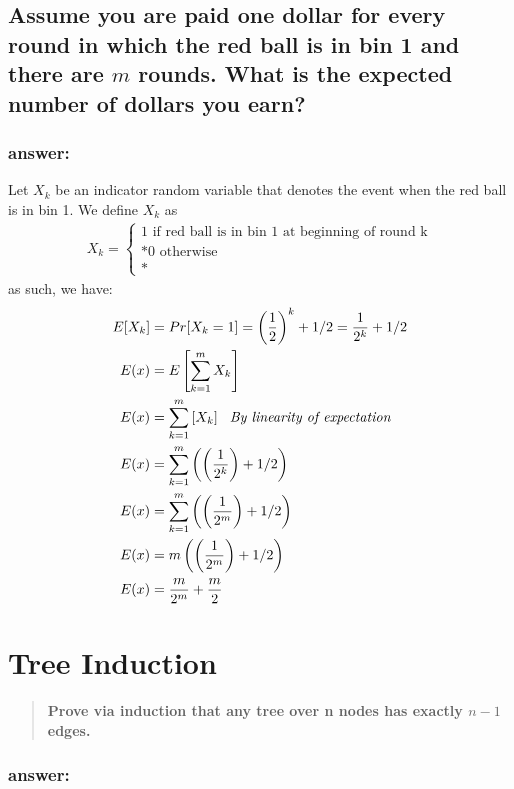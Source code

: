 \documentclass[titlepage]{article}
\theoremstyle{definition}
\begin{document}
  \subsection{Assume you are paid one dollar for every round in which the red
    ball is in bin 1 and there are $m$ rounds. What is the expected number of
    dollars you earn?}
    \subsubsection{answer:}
      Let $X_k$ be an indicator random variable that denotes the event when the red
      ball is in bin 1. We define $X_k$ as 
      \begin{align}
        X_k = \begin{cases} 1 \text{ if red ball is in bin 1 at beginning of round k} \\*
                            0 \text{ otherwise }\\*
        \end{cases}
      \end{align}
      as such, we have:
      \begin{align*}
        E[X_k] &= Pr[X_k = 1] = \left(\frac{1}{2}\right)^k + 1/2  = \frac{1}{2^k} + 1/2 \\*
        E(x) &= E\left[ \sum_{k=1}^m X_k \right] \\*
        E(x) &= \sum_{k=1}^m \left[X_k \right] \text{ \emph{ By linearity of expectation}}\\*
        E(x) &= \sum_{k=1}^m \left( \left( \frac{1}{2^k}\right) + 1/2 \right) \\*
        E(x) &= \sum_{k=1}^m \left( \left( \frac{1}{2^m}\right) + 1/2 \right) \\*
        E(x) &= m \left( \left( \frac{1}{2^m}\right) + 1/2 \right) \\*
        E(x) &= \frac{m}{2^m} + \frac{m}{2}
      \end{align*}


\section{Tree Induction}
\begin{quote}
  \textbf{Prove via induction that any tree over n nodes has exactly $n-1$
  edges. }
\end{quote}

\subsubsection{answer:}
\end{document}
